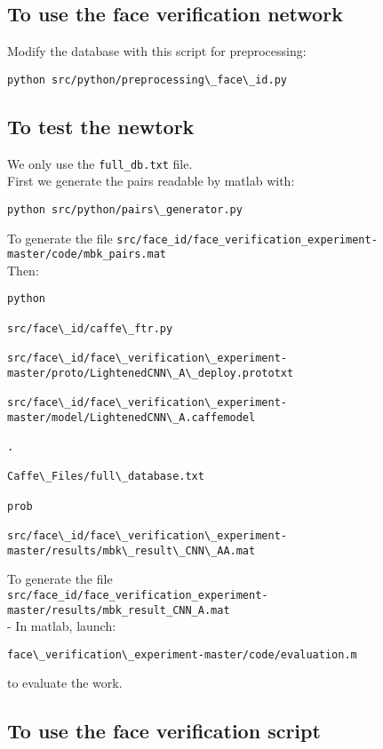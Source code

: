 \subsection{To use the face verification network}

Modify the database with this script for preprocessing:
\begin{verbatim}
python src/python/preprocessing\_face\_id.py
\end{verbatim}

\subsection{To test the newtork}

We only use the \texttt{full\_db.txt} file.\\
First we generate the pairs readable by matlab with:
\begin{verbatim}
python src/python/pairs\_generator.py
\end{verbatim}
To generate the file \texttt{src/face\_id/face\_verification\_experiment-master/code/mbk\_pairs.mat}\\

Then:

\begin{verbatim}
python

src/face\_id/caffe\_ftr.py 

src/face\_id/face\_verification\_experiment-
master/proto/LightenedCNN\_A\_deploy.prototxt

src/face\_id/face\_verification\_experiment-
master/model/LightenedCNN\_A.caffemodel

.

Caffe\_Files/full\_database.txt

prob

src/face\_id/face\_verification\_experiment-
master/results/mbk\_result\_CNN\_AA.mat
\end{verbatim}
To generate the file\\ \texttt{src/face\_id/face\_verification\_experiment-master/results/mbk\_result\_CNN\_A.mat}\\

- In matlab, launch:

\begin{verbatim}
face\_verification\_experiment-master/code/evaluation.m
\end{verbatim}

to evaluate the work.
\subsection{To use the face verification script}

